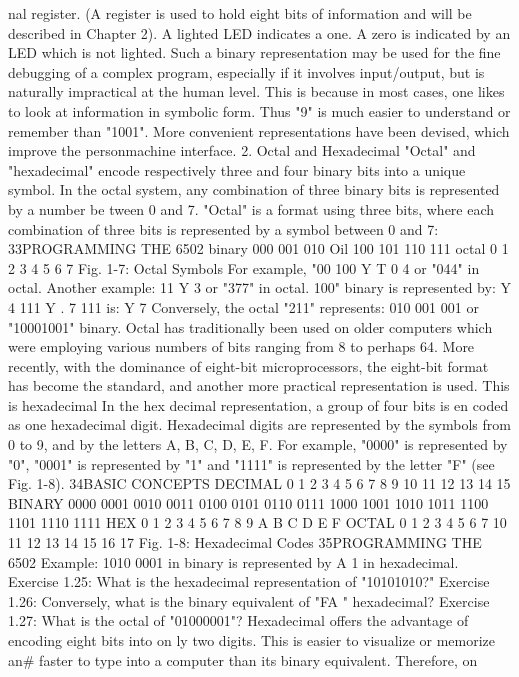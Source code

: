 \documentclass[12pt]{book}
\begin{document}
nal register. (A register is used to hold eight bits of information
and will be described in Chapter 2). A lighted LED indicates a one.
A zero is indicated by an LED which is not lighted. Such a binary
representation may be used for the fine debugging of a complex
program, especially if it involves input/output, but is naturally
impractical at the human level. This is because in most cases, one
likes to look at information in symbolic form. Thus "9" is much
easier to understand or remember than "1001". More convenient
representations have been devised, which improve the personmachine interface.
2. Octal and Hexadecimal
"Octal" and "hexadecimal" encode respectively three and four
binary bits into a unique symbol. In the octal system, any
combination of three binary bits is represented by a number be
tween 0 and 7.
"Octal" is a format using three bits, where each combination of
three bits is represented by a symbol between 0 and 7:
33PROGRAMMING THE 6502
binary
000
001
010
Oil
100
101
110
111
octal
0 1 2 3 4 5 6 7
Fig. 1-7: Octal Symbols
For example, "00 100
Y T
0 4
or "044" in octal.
Another example: 11
Y 3
or "377" in octal.
100" binary is represented by:
Y 4
111
Y
. 7
111 is:
Y 7
Conversely, the octal "211" represents:
010 001 001
or "10001001" binary.
Octal has traditionally been used on older computers which were
employing various numbers of bits ranging from 8 to perhaps 64.
More recently, with the dominance of eight-bit microprocessors,
the eight-bit format has become the standard, and another more
practical representation is used. This is hexadecimal
In the hex decimal representation, a group of four bits is en
coded as one hexadecimal digit. Hexadecimal digits are
represented by the symbols from 0 to 9, and by the letters A, B, C,
D, E, F. For example, "0000" is represented by "0", "0001" is
represented by "1" and "1111" is represented by the letter "F"
(see Fig. 1-8).
34BASIC CONCEPTS
DECIMAL
0 1 2 3 4 5 6 7 8 9
10
11
12
13
14
15
BINARY
0000
0001
0010
0011
0100
0101
0110
0111
1000
1001
1010
1011
1100
1101
1110
1111
HEX
0 1 2 3 4 5 6 7 8 9 A B C D E F
OCTAL
0 1 2 3 4 5 6 7
10
11
12
13
14
15
16
17
Fig. 1-8: Hexadecimal Codes
35PROGRAMMING THE 6502
Example: 1010 0001 in binary is represented by
A 1 in hexadecimal.
Exercise 1.25: What is the hexadecimal representation of
"10101010?"
Exercise 1.26: Conversely, what is the binary equivalent of "FA "
hexadecimal?
Exercise 1.27: What is the octal of "01000001"?
Hexadecimal offers the advantage of encoding eight bits into on
ly two digits. This is easier to visualize or memorize an# faster to
type into a computer than its binary equivalent. Therefore, on
\end{document}
